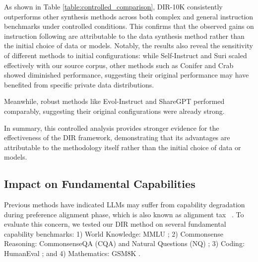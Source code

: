 As shown in Table \ref{table:controlled_comparison}, DIR-10K consistently outperforms other synthesis methods across both complex and general instruction benchmarks under controlled conditions. This confirms that the observed gains on instruction following are attributable to the data synthesis method rather than the initial choice of data or models. Notably, the results also reveal the sensitivity of different methods to initial configurations: while Self-Instruct and Suri scaled effectively with our source corpus, other methods such as Conifer and Crab showed diminished performance, suggesting their original performance may have benefited from specific private data distributions.

Meanwhile, robust methods like Evol-Instruct and ShareGPT performed comparably, suggesting their original configurations were already strong.

In summary, this controlled analysis provides stronger evidence for the effectiveness of the DIR framework, demonstrating that its advantages are attributable to the methodology itself rather than the initial choice of data or models.

\subsection{Impact on Fundamental Capabilities}

Previous methods have indicated LLMs may suffer from capability degradation during preference alignment phase, which is also known as alignment tax ~\cite{ouyang2022training}. To evaluate this concern, we tested our DIR method on several fundamental capability benchmarks: 1) World Knowledge: MMLU \cite{hendrycks2021measuring}; 2) Commonsense Reasoning: CommonsenseQA (CQA) \cite{talmor-etal-2019-commonsenseqa} and Natural Questions (NQ) \cite{kwiatkowski2019natural}; 3) Coding: HumanEval \cite{chen2021evaluatinglargelanguagemodels}; and 4) Mathematics: GSM8K \cite{cobbe2021trainingverifierssolvemath}.

